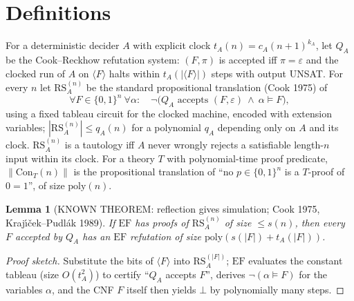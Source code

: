 \documentclass[11pt]{article}
\newtheorem{lemma}[theorem]{Lemma}
\newcommand{\EF}{\mathrm{EF}}
\newcommand{\RS}{\mathrm{RS}}
\begin{document}
\section{Definitions}
For a deterministic decider $A$ with explicit clock $t_A(n)=c_A(n+1)^{k_A}$, let
$Q_A$ be the Cook--Reckhow refutation system: $(F,\pi)$ is accepted iff $\pi=\varepsilon$ and the
clocked run of $A$ on $\langle F\rangle$ halts within $t_A(|\langle F\rangle|)$ steps with output UNSAT.
For every $n$ let $\RS_A^{(n)}$ be the standard propositional translation (Cook 1975) of
\[
\forall F\in\{0,1\}^n\ \forall \alpha:\quad \neg\bigl(Q_A\text{ accepts }(F,\varepsilon)\ \wedge\ \alpha\models F\bigr),
\]
using a fixed tableau circuit for the clocked machine, encoded with extension variables;
$|\RS_A^{(n)}|\le q_A(n)$ for a polynomial $q_A$ depending only on $A$ and its clock.
$\RS_A^{(n)}$ is a tautology iff $A$ never wrongly rejects a satisfiable length-$n$ input within its clock.
For a theory $T$ with polynomial-time proof predicate, $\|\mathrm{Con}_T(n)\|$ is the propositional
translation of ``no $p\in\{0,1\}^n$ is a $T$-proof of $0=1$'', of size $\mathrm{poly}(n)$.

\begin{lemma}[KNOWN THEOREM: reflection gives simulation; Cook 1975, Kraj\'{\i}\v{c}ek--Pudl\'ak 1989]\label{lem:sim}
If $\EF$ has proofs of $\RS_A^{(n)}$ of size $\le s(n)$, then every $F$ accepted by $Q_A$ has an
$\EF$ refutation of size $\mathrm{poly}(s(|F|)+t_A(|F|))$.
\end{lemma}
\begin{proof}[Proof sketch]
Substitute the bits of $\langle F\rangle$ into $\RS_A^{(|F|)}$; $\EF$ evaluates the constant tableau
(size $O(t_A^2)$) to certify ``$Q_A$ accepts $F$'', derives $\neg(\alpha\models F)$ for the
variables $\alpha$, and the CNF $F$ itself then yields $\bot$ by polynomially many steps.
\end{proof}
\end{document}
